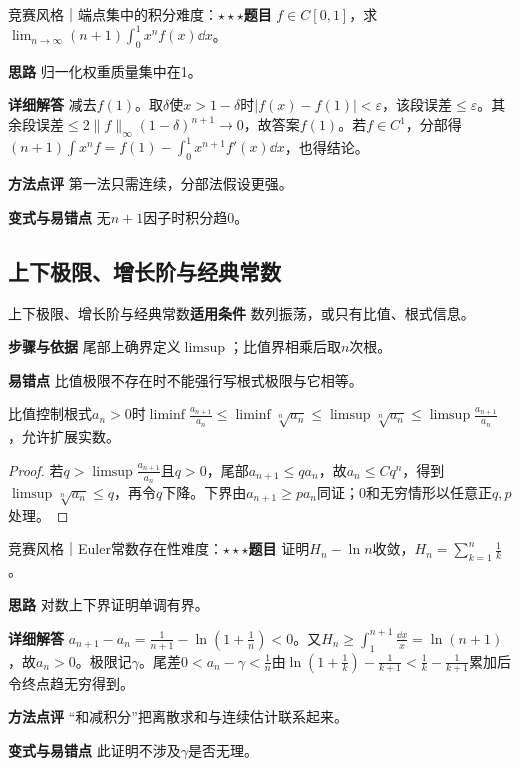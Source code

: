 \begin{example}{竞赛风格｜端点集中的积分}{难度：$\star\star\star$}\label{deep:ex:limits_source_deep:laplace}\textbf{题目} $f\in C[0,1]$，求$\lim_{n\to\infty}(n+1)\int_0^1x^nf(x)\dd x$。\par\textbf{思路} 归一化权重质量集中在1。\par\textbf{详细解答} 减去$f(1)$。取$\delta$使$x>1-\delta$时$|f(x)-f(1)|<\varepsilon$，该段误差$\le\varepsilon$。其余段误差$\le2\|f\|_\infty(1-\delta)^{n+1}\to0$，故答案$f(1)$。若$f\in C^1$，分部得$(n+1)\int x^nf=f(1)-\int_0^1x^{n+1}f'(x)\dd x$，也得结论。\par\textbf{方法点评} 第一法只需连续，分部法假设更强。\par\textbf{变式与易错点} 无$n+1$因子时积分趋0。\end{example}

\subsection{上下极限、增长阶与经典常数}\label{deep:limits_source_deep:asymptotic}

\begin{method}{上下极限、增长阶与经典常数}\textbf{适用条件} 数列振荡，或只有比值、根式信息。\par\textbf{步骤与依据} 尾部上确界定义$\limsup$；比值界相乘后取$n$次根。\par\textbf{易错点} 比值极限不存在时不能强行写根式极限与它相等。\end{method}

\begin{theorem}{比值控制根式}$a_n>0$时$\liminf \frac{a_{n+1}}{a_n}\le\liminf\sqrt[n]{a_n}\le\limsup\sqrt[n]{a_n}\le\limsup \frac{a_{n+1}}{a_n}$，允许扩展实数。\end{theorem}\begin{proof}若$q>\limsup \frac{a_{n+1}}{a_n}$且$q>0$，尾部$a_{n+1}\le q a_n$，故$a_n\le Cq^n$，得到$\limsup\sqrt[n]{a_n}\le q$，再令$q$下降。下界由$a_{n+1}\ge p a_n$同证；0和无穷情形以任意正$q,p$处理。\end{proof}

\begin{example}{竞赛风格｜Euler常数存在性}{难度：$\star\star\star$}\label{deep:ex:limits_source_deep:gamma}\textbf{题目} 证明$H_n-\ln n$收敛，$H_n=\sum_{k=1}^n\frac{1}{k}$。\par\textbf{思路} 对数上下界证明单调有界。\par\textbf{详细解答} $a_{n+1}-a_n=\frac{1}{n+1}-\ln(1+\frac{1}{n})<0$。又$H_n\ge\int_1^{n+1}\frac{\dd x}{x}=\ln(n+1)$，故$a_n>0$。极限记$\gamma$。尾差$0<a_n-\gamma<\frac{1}{n}$由$\ln(1+\frac{1}{k})-\frac{1}{k+1}<\frac{1}{k}-\frac{1}{k+1}$累加后令终点趋无穷得到。\par\textbf{方法点评} “和减积分”把离散求和与连续估计联系起来。\par\textbf{变式与易错点} 此证明不涉及$\gamma$是否无理。\end{example}

